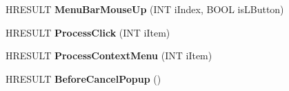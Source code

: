\begin{DoxyCompactItemize}
H\+R\+E\+S\+U\+LT {\bfseries Menu\+Bar\+Mouse\+Up} (I\+NT i\+Index, B\+O\+OL is\+L\+Button)
\item 
\mbox{\label{class_c_menu_toolbar_base_a9c297b8121d3f322be697d9023cf9a06}} 
H\+R\+E\+S\+U\+LT {\bfseries Process\+Click} (I\+NT i\+Item)
\item 
\mbox{\label{class_c_menu_toolbar_base_a33895bbedbb10af200fd0df1c855c87d}} 
H\+R\+E\+S\+U\+LT {\bfseries Process\+Context\+Menu} (I\+NT i\+Item)
\item 
\mbox{\label{class_c_menu_toolbar_base_adc7808291d7166b198e1572926b90dd9}} 
H\+R\+E\+S\+U\+LT {\bfseries Before\+Cancel\+Popup} ()
\end{DoxyCompactItemize}
